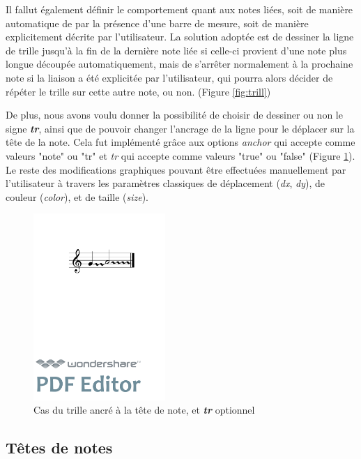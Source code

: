 \documentclass[a4paper,10pt,twocolumn]{article}
\newenvironment{code}
  {\fontfamily{pnc}\selectfont}{}
\begin{document}
Il fallut également définir le comportement quant aux notes liées, soit de manière automatique de par la présence d'une barre de mesure, soit de manière explicitement décrite par l'utilisateur. La solution adoptée est de dessiner la ligne de trille jusqu'à la fin de la dernière note liée si celle-ci provient d'une note plus longue découpée automatiquement, mais de s'arrêter normalement à la prochaine note si la liaison a été explicitée par l'utilisateur, qui pourra alors décider de répéter le trille sur cette autre note, ou non. (Figure \ref{fig:trill})

De plus, nous avons voulu donner la possibilité de choisir de dessiner ou non le signe \textit{\textbf{tr}}, ainsi que de pouvoir changer l'ancrage de la ligne pour le déplacer sur la tête de la note. Cela fut implémenté grâce aux options \textit{anchor} qui accepte comme valeurs "note" ou "tr" et \textit{tr} qui accepte comme valeurs "true" ou "false" (Figure \ref{fig:trillanchor}). Le reste des modifications graphiques pouvant être effectuées manuellement par l'utilisateur à travers les paramètres classiques de déplacement (\textit{dx}, \textit{dy}), de couleur (\textit{color}), et de taille (\textit{size}).

\begin{figure}[h]
\centering
\begin{code}
[ \textbackslash{}trill\textless{}tr="false", anchor="note"\textgreater{}( \{g\} \{a/2\} ) ]
\end{code}
\includegraphics[width=5cm]{img/trillanchor.pdf}
\caption{Cas du trille ancré à la tête de note, et \textit{\textbf{tr}} optionnel}
\label{fig:trillanchor}
\end{figure}

\subsection{Têtes de notes}
\end{document}
